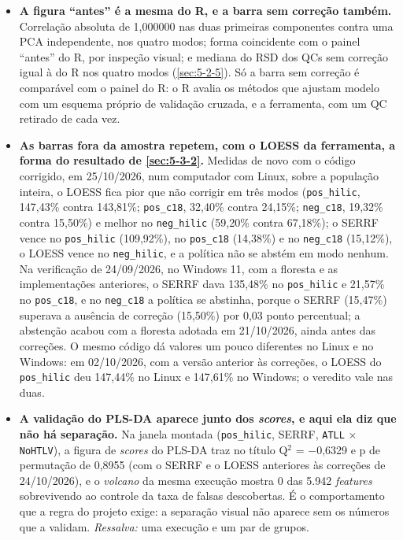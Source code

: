 \begin{itemize}
\item \textbf{A figura ``antes'' é a mesma do R, e a barra sem correção também.} Correlação absoluta de 1,000000 nas duas primeiras componentes contra uma PCA independente, nos quatro modos; forma coincidente com o painel ``antes'' do R, por inspeção visual; e mediana do RSD dos QCs sem correção igual à do R nos quatro modos (\ref{sec:5-2-5}). Só a barra sem correção é comparável com o painel do R: o R avalia os métodos que ajustam modelo com um esquema próprio de validação cruzada, e a ferramenta, com um QC retirado de cada vez.
\item \textbf{As barras fora da amostra repetem, com o LOESS da ferramenta, a forma do resultado de \ref{sec:5-3-2}.} Medidas de novo com o código corrigido, em 25/10/2026, num computador com Linux, sobre a população inteira, o LOESS fica pior que não corrigir em três modos (\texttt{pos\_\allowbreak{}hilic}, 147,43\% contra 143,81\%; \texttt{pos\_\allowbreak{}c18}, 32,40\% contra 24,15\%; \texttt{neg\_\allowbreak{}c18}, 19,32\% contra 15,50\%) e melhor no \texttt{neg\_\allowbreak{}hilic} (59,20\% contra 67,18\%); o SERRF vence no \texttt{pos\_\allowbreak{}hilic} (109,92\%), no \texttt{pos\_\allowbreak{}c18} (14,38\%) e no \texttt{neg\_\allowbreak{}c18} (15,12\%), o LOESS vence no \texttt{neg\_\allowbreak{}hilic}, e a política não se abstém em modo nenhum. Na verificação de 24/09/2026, no Windows 11, com a floresta e as implementações anteriores, o SERRF dava 135,48\% no \texttt{pos\_\allowbreak{}hilic} e 21,57\% no \texttt{pos\_\allowbreak{}c18}, e no \texttt{neg\_\allowbreak{}c18} a política se abstinha, porque o SERRF (15,47\%) superava a ausência de correção (15,50\%) por 0,03 ponto percentual; a abstenção acabou com a floresta adotada em 21/10/2026, ainda antes das correções. O mesmo código dá valores um pouco diferentes no Linux e no Windows: em 02/10/2026, com a versão anterior às correções, o LOESS do \texttt{pos\_\allowbreak{}hilic} deu 147,44\% no Linux e 147,61\% no Windows; o veredito vale nas duas.
\item \textbf{A validação do PLS-DA aparece junto dos \textit{scores}, e aqui ela diz que não há separação.} Na janela montada (\texttt{pos\_\allowbreak{}hilic}, SERRF, \texttt{ATLL} $\times$ \texttt{NoHTLV}), a figura de \textit{scores} do PLS-DA traz no título Q$^{2}$ = $-$0,6329 e p de permutação de 0,8955 (com o SERRF e o LOESS anteriores às correções de 24/10/2026), e o \textit{volcano} da mesma execução mostra 0 das 5.942 \textit{features} sobrevivendo ao controle da taxa de falsas descobertas. É o comportamento que a regra do projeto exige: a separação visual não aparece sem os números que a validam. \textit{Ressalva:} uma execução e um par de grupos.
\end{itemize}


